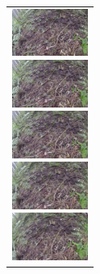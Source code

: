 \begin{enumerate}
\begin{end}
\begin{figure}[H]
\begin{tabular}{l}
    \end{tabular}
\end{figure}
\begin{figure}[htbp]
    \begin{tabular}{l}
      \begin{minipage}{0.165\hsize}
        \begin{center}
          \includegraphics[clip, width=2.5cm]{./Figures/still_stop1-1.eps}
        \end{center}
      \end{minipage}
      \begin{minipage}{0.165\hsize}
        \begin{center}
          \includegraphics[clip, width=2.5cm]{./Figures/still_stop1-2.eps}
        \end{center}
      \end{minipage}
      \begin{minipage}{0.165\hsize}
        \begin{center}
          \includegraphics[clip, width=2.5cm]{./Figures/still_stop1-3.eps}
        \end{center}
      \end{minipage}
      \begin{minipage}{0.165\hsize}
        \begin{center}
          \includegraphics[clip, width=2.5cm]{./Figures/still_stop1-4.eps}
        \end{center}
      \end{minipage}
      \begin{minipage}{0.165\hsize}
        \begin{center}
          \includegraphics[clip, width=2.5cm]{./Figures/still_stop1-5.eps}

\end{center}
\end{minipage}
\end{tabular}
\end{figure}
\end{end}
\end{enumerate}

